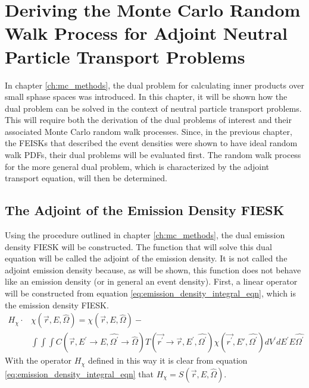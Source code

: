 \chapter{Deriving the Monte Carlo Random Walk Process for Adjoint Neutral Particle Transport Problems}
\label{ch:adjoint_neutral_particle_transport}
In chapter \ref{ch:mc_methods}, the dual problem for calculating inner products
over small sphase spaces was introduced. In this chapter, it will be shown how
the dual problem can be solved in the context of neutral particle transport 
problems. This will require both the derivation of the dual problems of interest
and their associated Monte Carlo random walk processes. Since, in the previous
chapter, the FEISKs that described the event densities were shown to have 
ideal random walk PDFs, their dual problems will be evaluated first. The 
random walk process for the more general dual problem, which is characterized
by the adjoint transport equation, will then be determined. 

\section{The Adjoint of the Emission Density FIESK}
Using the procedure outlined in chapter \ref{ch:mc_methods}, the dual emission
density FIESK will be constructed. The function that will solve this dual 
equation will be called the adjoint of the emission density. It is not called
the adjoint emission density because, as will be shown, this function does
not behave like an emission density (or in general an event density). First, 
a linear operator will be constructed from equation 
\ref{eq:emission_density_integral_eqn}, which is the emission density FIESK. 
\begin{equation}
  \begin{split}
    H_{\chi} \cdot &\chi(\vec{r},E,\hat{\Omega}) = 
    \chi(\vec{r},E,\hat{\Omega}) - \\
    & \int\int\int C(\vec{r},E^{'} \to E,\hat{\Omega^{'}} \to \hat{\Omega})
    T(\vec{r^{'}} \to \vec{r},E^{'},\hat{\Omega^{'}}) 
    \chi(\vec{r^{'}},E',\hat{\Omega^{'}}) dV^{'}dE^{'}E\hat{\Omega^{'}}
  \end{split}
\end{equation}
With the operator $H_{\chi}$ defined in this way it is clear from equation
\ref{eq:emission_density_integral_eqn} that 
$H_{\chi} = S(\vec{r},E,\hat{\Omega})$.

